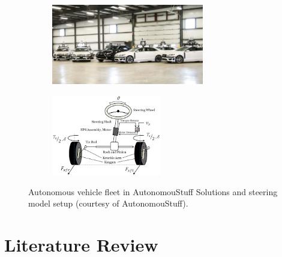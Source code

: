 \documentclass[letterpaper,12pt]{article}   %
\begin{document}
\vspace*{12pt}


\begin{figure}[htbp]
  \centering
  \begin{subfigure}[b]{0.48\linewidth}
    \centering
    \includegraphics[height=3.5cm]{figs/img/autonomousVehiclesAStuff}
    \caption{}
    \label{fig:fleet}
  \end{subfigure}
  \begin{subfigure}[b]{0.48\linewidth}
    \centering
    \includegraphics[height=3.5cm]{figs/img/autonomousVehiclesSteering}
    \caption{}
    \label{fig:steerSystem}
  \end{subfigure}
  \caption{ Autonomous vehicle fleet in AutonomouStuff Solutions and  steering model setup (courtesy of AutonomouStuff). }
  \label{fig:AstuffFleetSteeringSetup}
\end{figure}


 \section{Literature Review}
\end{document}
